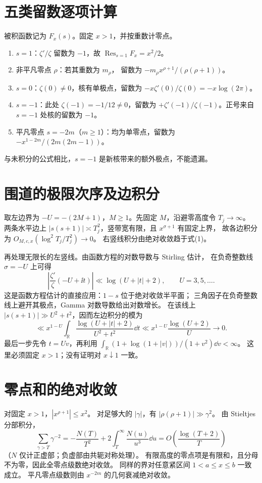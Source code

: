 \documentclass[UTF8,fontset=fandol,11pt]{ctexart}
\begin{document}
\section{五类留数逐项计算}
被积函数记为 $F_x(s)$。固定 $x>1$，并按重数计零点。
\begin{enumerate}
 \item $s=1$：$\zeta'/\zeta$ 留数为 $-1$，故
 $\operatorname{Res}_{s=1}F_x=x^2/2$。
 \item 非平凡零点 $\rho$：若其重数为 $m_\rho$，
 留数为 $-m_\rho x^{\rho+1}/(\rho(\rho+1))$。
 \item $s=0$：$\zeta(0)\ne0$，核有单极点，留数为
 $-x\zeta'(0)/\zeta(0)=-x\log(2\pi)$。
 \item $s=-1$：此处 $\zeta(-1)=-1/12\ne0$，留数为
 $+\zeta'(-1)/\zeta(-1)$。正号来自 $s=-1$ 处核的留数为 $-1$。
 \item 平凡零点 $s=-2m$（$m\ge1$）：均为单零点，留数为
 $-x^{1-2m}/(2m(2m-1))$。
\end{enumerate}
与未积分的公式相比，$s=-1$ 是新核带来的额外极点，不能遗漏。

\section{围道的极限次序及边积分}
取左边界为 $-U=-(2M+1)$，$M\ge1$。先固定 $M$，沿避零高度令 $T_j\to\infty$。
两条水平边上 $|s(s+1)|\asymp T_j^2$，竖带宽有限，且 $x^{\sigma+1}$ 有固定上界，
故各边积分为 $O_{M,c,x}(\log^2T_j/T_j^2)\to0$。
右竖线积分由绝对收敛趋于式(1)。

再处理无限长的左竖线。由函数方程的对数导数与 Stirling 估计，
在负奇整数线 $\sigma=-U$ 上可得
\[
 \left|\frac{\zeta'}{\zeta}(-U+\ii t)\right|
 \ll\log(U+|t|+2),\qquad U=3,5,\ldots .
\]
这是函数方程估计的直接应用：$1-s$ 位于绝对收敛半平面；
三角因子在负奇整数线上避开其极点，Gamma 对数导数给出对数增长。
在该线上
$|s(s+1)|\gg U^2+t^2$，因而左边积分的模为
\[
 \ll x^{1-U}\int_{\mathbb R}
       \frac{\log(U+|t|+2)}{U^2+t^2}\dd t
 \ll x^{1-U}\frac{\log(U+2)}U\longrightarrow0.
\]
最后一步先令 $t=Uv$，再利用
$\int_{\mathbb R}(1+\log(1+|v|))/(1+v^2)\dd v<\infty$。
这里必须固定 $x>1$；没有证明对 $x\downarrow1$ 一致。

\section{零点和的绝对收敛}
对固定 $x>1$，$|x^{\rho+1}|\le x^2$。
对足够大的 $|\gamma|$，有 $|\rho(\rho+1)|\gg\gamma^2$。
由 Stieltjes 分部积分，
\[
 \sum_{\gamma>T}\gamma^{-2}
 =-\frac{N(T)}{T^2}+2\int_T^\infty\frac{N(u)}{u^3}\dd u
 =O\left(\frac{\log(T+2)}T\right)
\]
（$N$ 仅计正虚部；负虚部由共轭对称处理）。
有限高度的零点项是有限和，且分母不为零，因此全零点级数绝对收敛。
同样的界对任意紧区间 $1<a\le x\le b$ 一致成立。
平凡零点级数则由 $x^{-2m}$ 的几何衰减绝对收敛。
\end{document}
